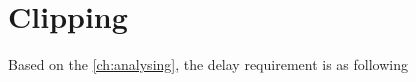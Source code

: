 \newcommand{\reqclipping}{The delay unit must delay the input signal, in time defined by external unit.}

\section{Clipping}
Based on the \autoref{ch:analysing}, the delay requirement is as following

\begin{requirement}\label{req:hard_clipping}
\end{requirement}

\begin{requirement}\label{req:soft_clipping}
\end{requirement}


